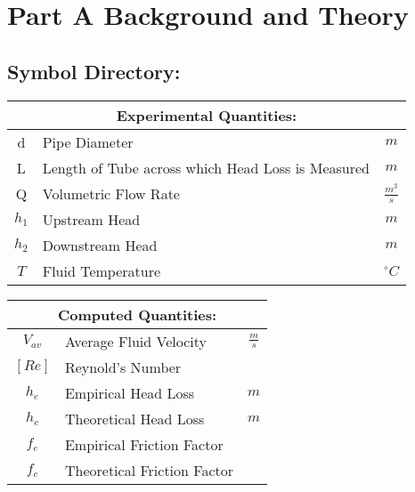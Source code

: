 \documentclass[12pt]{article}
\begin{document}
	\section{Part A Background and Theory}
	\hfill\break\break
	\subsection{Symbol Directory:}
	{
	\centering
	\begin{tabular}{|c|l|c|}
		\hline
		\multicolumn{3}{|c|}{\textbf{Experimental Quantities:}} \\
		\hline
		\hline
		d & Pipe Diameter & $m$\\
		L & Length of Tube across which Head Loss is Measured & $m$ \\
		Q & Volumetric Flow Rate & $\frac{m^3}{s}$\\
		$h_1$ & Upstream Head & $m$ \\
		$h_2$ & Downstream Head & $m$ \\
		$T$ & Fluid Temperature & $^{\circ}C$ \\
		\hline
	\end{tabular}
	}
	\hfill\break\break\break
	{
	\centering
	\begin{tabular}{|c|l|c|}
		\hline
		\multicolumn{3}{|c|}{\textbf{Computed Quantities:}} \\
		\hline
		\hline
		$V_{av}$ & Average Fluid Velocity & $\frac{m}{s}$\\
		$[Re]$ & Reynold's Number & ${}$ \\
		$h_e$ & Empirical Head Loss & $m$\\
		$h_c$ & Theoretical Head Loss & $m$\\
		$f_e$ & Empirical Friction Factor & ${}$\\
		$f_c$ & Theoretical Friction Factor & ${}$\\
		\hline
	\end{tabular}
	}
\end{document}
